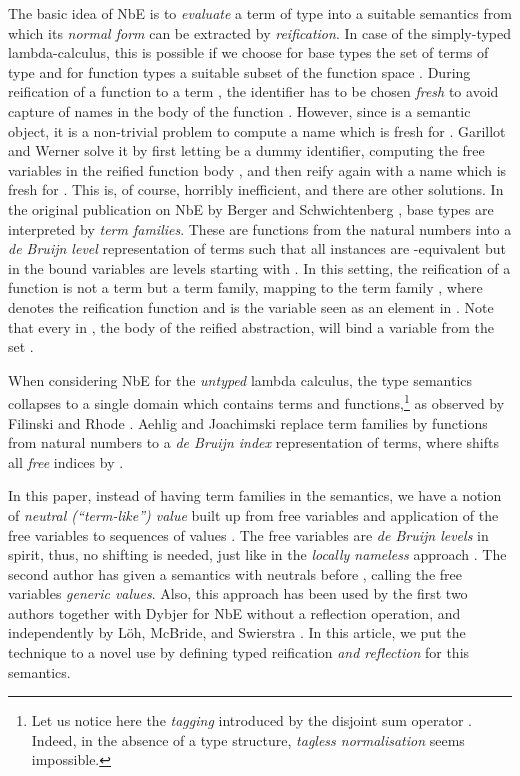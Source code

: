 \documentclass{LMCS}
\begin{document}
The basic idea of NbE is to \emph{evaluate} a term of type  into a
suitable semantics  from which its \emph{normal form} can be
extracted by \emph{reification}.  In case of the simply-typed
lambda-calculus, this is possible if we choose for base types 
the set of terms of type  and for function types  a
suitable subset of the function space .  During
reification of a function  to a term , the identifier  has to be chosen \emph{fresh} to avoid capture
of names in the body of the function .  However, since  is a
semantic object, it is a non-trivial problem to compute a name which
is fresh for .  Garillot and Werner \cite{garillotWerner:tphols07}
solve it by first letting  be a dummy identifier, computing the
free variables in the reified function body , and then reify 
again with a name  which is fresh for .  This is, of course,
horribly inefficient, and there are other solutions.  In the original
publication on NbE by Berger and Schwichtenberg
\cite{bergerSchwichtenberg:lics91}, base types  are interpreted by \emph{term families}.  These are
functions  from the natural numbers into a \emph{de Bruijn level}
representation of terms such that all instances  are
-equivalent but in  the bound variables are levels
starting with . In this setting, the reification of a function  is not a term but a term family, mapping  to the
term family ,
where  denotes the reification function and  is
the variable  seen as an element in . 
Note that every  in , 
the body of the reified abstraction, will bind a variable 
from the set .

When considering NbE for the \emph{untyped} lambda calculus, the type
semantics collapses to a single domain  which contains terms and functions,\footnote{
Let us notice
here the \emph{tagging} introduced by the disjoint sum operator .
Indeed, in the absence of a type structure, \emph{tagless
  normalisation} seems impossible.  
}
as observed by Filinski and Rhode \cite{filinskiRohde:untypedNbE}.  
Aehlig and Joachimski \cite{aehlig:nbe} replace term families by
functions  from natural numbers to a \emph{de Bruijn index}
representation of terms, where  shifts all \emph{free} indices
by . 

In this paper, instead of having term families  in
the semantics, we have a notion of \emph{neutral (``term-like'')
  value} built up from free variables  and application of the
free variables to sequences of values .  The free variables
are \emph{de Bruijn levels} in spirit, thus, no shifting is needed,
just like in the \emph{locally nameless} approach
\cite{pollack:alpha}.  The second author has given a semantics with
neutrals before \cite{coquand:type}, calling the free variables
\emph{generic values}.  Also, this approach has been used by the first
two authors together with Dybjer \cite{abelCoquandDybjer:mpc08} for
NbE without a reflection operation, and independently by L\"oh,
McBride, and Swierstra
\cite{loehMcBrideSwierstra:tutorialDependentlyLambda}.  In this
article, we put the technique to a novel use by defining typed
reification \emph{and reflection} for this semantics.
\end{document}
